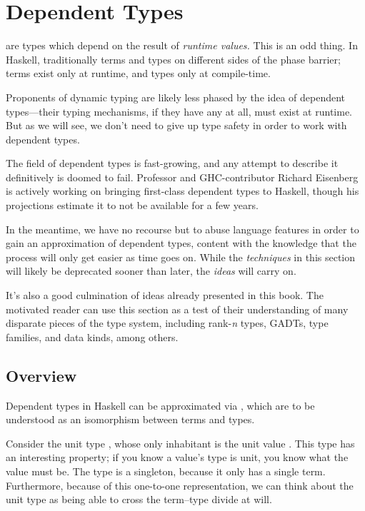 \documentclass[book.tex]{subfiles}
\begin{document}
\chapter{Dependent Types}

 are types which depend on the result of
\emph{runtime values.} This is an odd thing. In Haskell, traditionally terms and
types on different sides of the phase barrier; terms exist only at runtime, and
types only at compile-time.

Proponents of dynamic typing are likely less phased by the idea of dependent
types---their typing mechanisms, if they have any at all, must exist at runtime.
But as we will see, we don't need to give up type safety in order to work with
dependent types.

The field of dependent types is fast-growing, and any attempt to describe it
definitively is doomed to fail. Professor and GHC-contributor Richard Eisenberg
is actively working on bringing first-class dependent types to Haskell, though
his projections estimate it to not be available for a few years.

In the meantime, we have no recourse but to abuse language features in order to
gain an approximation of dependent types, content with the knowledge that the
process will only get easier as time goes on. While the \emph{techniques} in
this section will likely be deprecated sooner than later, the \emph{ideas} will
carry on.

It's also a good culmination of ideas already presented in this book. The
motivated reader can use this section as a test of their understanding of many
disparate pieces of the type system, including rank-\emph{n} types, GADTs, type
families, and data kinds, among others.


\section{Overview}

Dependent types in Haskell can be approximated via
, which are to be understood as an \gls{isomorphism}
between terms and types.

Consider the unit type \ty{()}, whose only inhabitant is the unit value \hs{()}.
This type has an interesting property; if you know a value's type is unit, you
know what the value must be. The type \ty{()} is a singleton, because it only
has a single term. Furthermore, because of this one-to-one representation, we
can think about the unit type as being able to cross the term--type divide at
will.
\end{document}
